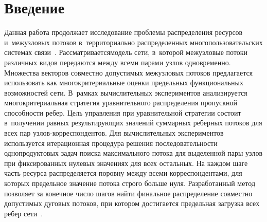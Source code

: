 
  
\vspace*{-4pt}



\thispagestyle{headings}

\begin{multicols}{2}

\label{st\stat}


\section{Введение}

Данная работа продолжает исследование проб\-ле\-мы распределения ресурсов 
и~межузловых потоков в~территориально распределенных многопользовательских 
системах связи~\cite{Mal20-5}.
Рассматривается\linebreak  модель сети, в~которой межузловые потоки различных видов 
передаются между всеми парами узлов одновременно. Множества векторов 
совместно допустимых межузловых потоков \mbox{предлагается} использовать как 
многокритериальные оценки предельных функциональных возможностей сети. 
В~рамках вычислительных экспериментов анализируется многокритериальная 
стратегия  уравнительного распределения пропускной способности ребер. Цель 
управления при уравнительной стратегии состоит в~получении равных  
результирующих значений суммарных реберных потоков для всех пар узлов-кор\-рес\-пон\-ден\-тов. 
Для вычислительных экспериментов используется итерационная 
процедура решения последовательности однопродуктовых задач поиска 
максимального потока для выделенной пары узлов при фиксированных нулевых 
значениях для всех остальных. На каждом шаге  часть  ресурса распределяется 
поровну между всеми корреспондентами, для которых предельное значение потока 
строго больше нуля. Разработанный метод позволяет за конечное число шагов 
найти финальное распределение совместно допустимых дуговых потоков, при 
котором достигается предельная загрузка всех ребер сети~\cite{Mal20-5}.


\end{multicols}
